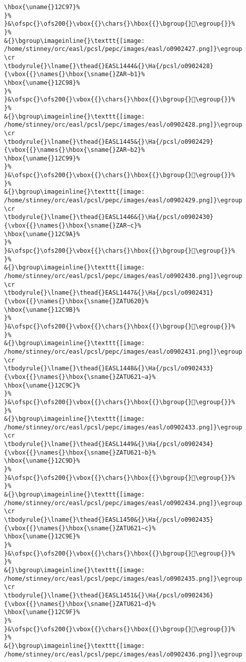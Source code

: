 \begin{verbatim}
\hbox{\uname{}12C97}%
}%
}&\ofspc{}\ofs200{}\vbox{{}\chars{}\hbox{{}\bgroup{}𒲗\egroup{}}%
}%
&{}\bgroup\imageinline{}\texttt{[image: /home/stinney/orc/easl/pcsl/pepc/images/easl/o0902427.png]}\egroup
\cr
\tbodyrule{}\lname{}\thead{}EASL1444&{}\Ha{/pcsl/o0902428}{\vbox{{}\names{}\hbox{\sname{}ZAR∼b1}%
\hbox{\uname{}12C98}%
}%
}&\ofspc{}\ofs200{}\vbox{{}\chars{}\hbox{{}\bgroup{}𒲘\egroup{}}%
}%
&{}\bgroup\imageinline{}\texttt{[image: /home/stinney/orc/easl/pcsl/pepc/images/easl/o0902428.png]}\egroup
\cr
\tbodyrule{}\lname{}\thead{}EASL1445&{}\Ha{/pcsl/o0902429}{\vbox{{}\names{}\hbox{\sname{}ZAR∼b2}%
\hbox{\uname{}12C99}%
}%
}&\ofspc{}\ofs200{}\vbox{{}\chars{}\hbox{{}\bgroup{}𒲙\egroup{}}%
}%
&{}\bgroup\imageinline{}\texttt{[image: /home/stinney/orc/easl/pcsl/pepc/images/easl/o0902429.png]}\egroup
\cr
\tbodyrule{}\lname{}\thead{}EASL1446&{}\Ha{/pcsl/o0902430}{\vbox{{}\names{}\hbox{\sname{}ZAR∼c}%
\hbox{\uname{}12C9A}%
}%
}&\ofspc{}\ofs200{}\vbox{{}\chars{}\hbox{{}\bgroup{}𒲚\egroup{}}%
}%
&{}\bgroup\imageinline{}\texttt{[image: /home/stinney/orc/easl/pcsl/pepc/images/easl/o0902430.png]}\egroup
\cr
\tbodyrule{}\lname{}\thead{}EASL1447&{}\Ha{/pcsl/o0902431}{\vbox{{}\names{}\hbox{\sname{}ZATU620}%
\hbox{\uname{}12C9B}%
}%
}&\ofspc{}\ofs200{}\vbox{{}\chars{}\hbox{{}\bgroup{}𒲛\egroup{}}%
}%
&{}\bgroup\imageinline{}\texttt{[image: /home/stinney/orc/easl/pcsl/pepc/images/easl/o0902431.png]}\egroup
\cr
\tbodyrule{}\lname{}\thead{}EASL1448&{}\Ha{/pcsl/o0902433}{\vbox{{}\names{}\hbox{\sname{}ZATU621∼a}%
\hbox{\uname{}12C9C}%
}%
}&\ofspc{}\ofs200{}\vbox{{}\chars{}\hbox{{}\bgroup{}𒲜\egroup{}}%
}%
&{}\bgroup\imageinline{}\texttt{[image: /home/stinney/orc/easl/pcsl/pepc/images/easl/o0902433.png]}\egroup
\cr
\tbodyrule{}\lname{}\thead{}EASL1449&{}\Ha{/pcsl/o0902434}{\vbox{{}\names{}\hbox{\sname{}ZATU621∼b}%
\hbox{\uname{}12C9D}%
}%
}&\ofspc{}\ofs200{}\vbox{{}\chars{}\hbox{{}\bgroup{}𒲝\egroup{}}%
}%
&{}\bgroup\imageinline{}\texttt{[image: /home/stinney/orc/easl/pcsl/pepc/images/easl/o0902434.png]}\egroup
\cr
\tbodyrule{}\lname{}\thead{}EASL1450&{}\Ha{/pcsl/o0902435}{\vbox{{}\names{}\hbox{\sname{}ZATU621∼c}%
\hbox{\uname{}12C9E}%
}%
}&\ofspc{}\ofs200{}\vbox{{}\chars{}\hbox{{}\bgroup{}𒲞\egroup{}}%
}%
&{}\bgroup\imageinline{}\texttt{[image: /home/stinney/orc/easl/pcsl/pepc/images/easl/o0902435.png]}\egroup
\cr
\tbodyrule{}\lname{}\thead{}EASL1451&{}\Ha{/pcsl/o0902436}{\vbox{{}\names{}\hbox{\sname{}ZATU621∼d}%
\hbox{\uname{}12C9F}%
}%
}&\ofspc{}\ofs200{}\vbox{{}\chars{}\hbox{{}\bgroup{}𒲟\egroup{}}%
}%
&{}\bgroup\imageinline{}\texttt{[image: /home/stinney/orc/easl/pcsl/pepc/images/easl/o0902436.png]}\egroup

\end{verbatim}

